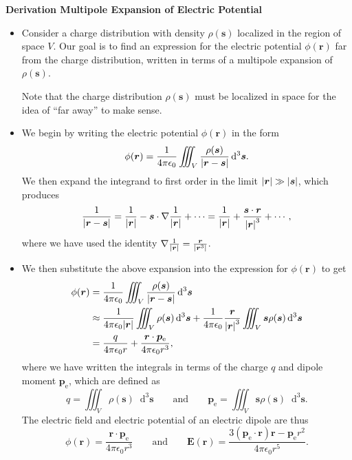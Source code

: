 \documentclass[11pt, a4paper]{article}
\newcommand{\diff}{\mathop{}\!\mathrm{d}} %
\newcommand{\eqtext}[1]{\qquad \text{#1} \qquad}
\renewcommand{\vec}[1]{\bm{#1}} %
\renewcommand{\r}{\vec{r}}
\newcommand{\E}{\vec{E}} %
\newcommand{\ee}{\epsilon_{0}}  %
\newcommand{\pe}{\vec{p}_{\text{e}}}  %
\newcommand{\s}{\vec{s}}  %
\newcommand{\ds}{\diff^{3} \s}  %
\renewcommand{\grad}{\nabla}
\begin{document}
\textbf{Derivation Multipole Expansion of Electric Potential}
\begin{itemize}
	\item Consider a charge distribution with density $ \rho(\s) $ localized in the region of space $ V $. Our goal is to find an expression for the electric potential $ \phi(\r) $ far from the charge distribution, written in terms of a multipole expansion of $ \rho(\s) $.
	
    Note that the charge distribution $ \rho(\s) $ must be localized in space for the idea of ``far away'' to make sense.

    \item We begin by writing the electric potential $ \phi(\r) $ in the form
	\begin{equation*}
		\phi(\r) = \frac{1}{4\pi \ee}\iiint_{V}\frac{\rho(\s)}{\abs{\r - \s}} \ds.
	\end{equation*}
    We then expand the integrand to first order in the limit $ \abs{\r} \gg \abs{\s}  $, which produces
	\begin{equation*}
        \frac{1}{\abs{\r - \s}} = \frac{1}{\abs{\r}} - \s \cdot \grad \frac{1}{\abs{\r}} + \cdots = \frac{1}{\abs{\r}} + \frac{\s \cdot \r}{\abs{\r}^{3}} + \cdots,
	\end{equation*}
    where we have used the identity $ \grad \frac{1}{\abs{\r}} = \frac{\r}{\abs{\r^{3}}} $.

    \item We then substitute the above expansion into the expression for $ \phi(\r) $ to get
	\begin{align*}
		\phi(\r) &= \frac{1}{4\pi \ee}\iiint_{V}\frac{\rho(\s)}{\abs{\r - \s}} \ds \\
        & \approx \frac{1}{4\pi \ee \abs{\r}}\iiint_{V} \rho(\s) \ds + \frac{1}{4\pi \ee}\frac{\r}{\abs{\r}^{3}}\iiint_{V} \s \rho(\s)\ds\\
		& = \frac{q}{4\pi \ee r} + \frac{\r \cdot \pe}{4\pi \ee r^{3}},
	\end{align*}
    where we have written the integrals in terms of the charge $ q $ and dipole moment $ \pe $, which are defined as
	\begin{equation*}
		q = \iiint_{V} \rho(\s) \ds \eqtext{and} \pe = \iiint_{V} \s \rho(\s) \ds.
	\end{equation*}
    The electric field and electric potential of an electric dipole are thus
    \begin{equation*}
        \phi(\r) = \frac{\r \cdot \pe}{4\pi \ee r^{3}} \qquad \text{and} \qquad \E(\r) = \frac{3 (\pe \cdot \r) \r - \pe r^{2}}{4 \pi \ee r^{5}}.
    \end{equation*}
    

\end{itemize}
\end{document}
